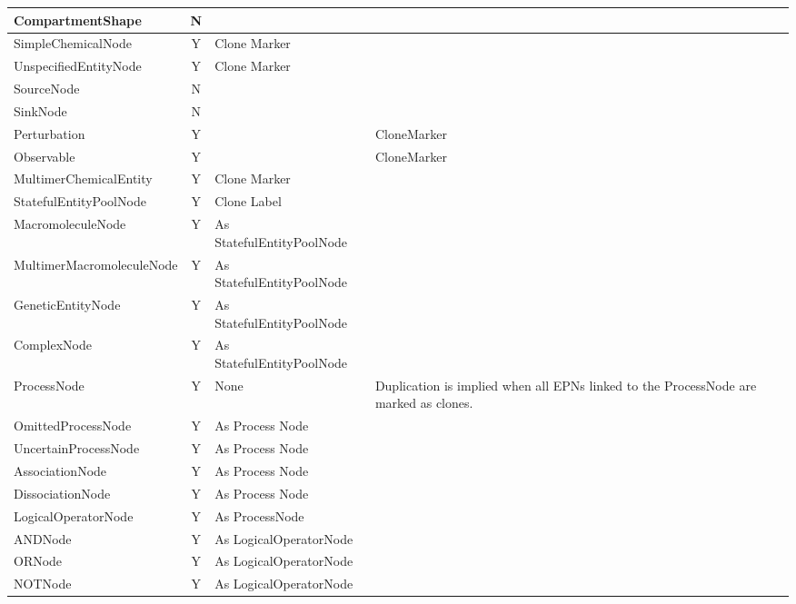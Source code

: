 \begin{center}
\begin{small}
\tablelasttail{\hline}
\label{tab:processduprules}
\begin{supertabular}{|l|c|p{5cm}|p{4cm}|}\hline
CompartmentShape   & N & & \\\hline
SimpleChemicalNode & Y & Clone Marker & \\\hline
UnspecifiedEntityNode & Y & Clone Marker & \\\hline
SourceNode & N & & \\\hline
SinkNode & N & & \\\hline
Perturbation & Y & & CloneMarker \\\hline
Observable & Y & & CloneMarker \\\hline
MultimerChemicalEntity & Y & Clone Marker & \\\hline
StatefulEntityPoolNode & Y & Clone Label & \\\hline
MacromoleculeNode & Y & As StatefulEntityPoolNode & \\\hline
MultimerMacromoleculeNode & Y & As StatefulEntityPoolNode & \\\hline
GeneticEntityNode & Y & As StatefulEntityPoolNode & \\\hline
ComplexNode & Y & As StatefulEntityPoolNode & \\\hline
ProcessNode & Y & None & Duplication is implied when all EPNs linked to the ProcessNode are marked as clones.\\\hline
OmittedProcessNode & Y & As Process Node & \\\hline
UncertainProcessNode & Y & As Process Node & \\\hline
AssociationNode & Y & As Process Node & \\\hline
DissociationNode & Y & As Process Node & \\\hline
LogicalOperatorNode & Y & As ProcessNode & \\\hline
ANDNode & Y & As LogicalOperatorNode & \\\hline
ORNode & Y & As LogicalOperatorNode & \\\hline
NOTNode & Y & As LogicalOperatorNode & \\\hline
\end{supertabular}
\end{small}
\end{center}

